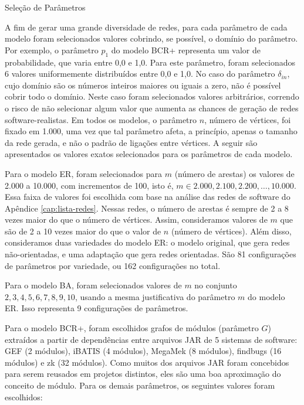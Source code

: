 \begin{section}{Seleção de Parâmetros} \label{sec:parametros}
	
	A fim de gerar uma grande diversidade de redes, para cada parâmetro de cada modelo foram selecionados valores cobrindo, se possível, o domínio do parâmetro. Por exemplo, o parâmetro $p_1$ do modelo BCR+ representa um valor de probabilidade, que varia entre 0,0 e 1,0. Para este parâmetro, foram selecionados 6 valores uniformemente distribuídos entre 0,0 e 1,0. No caso do parâmetro $\delta_{in}$, cujo domínio são os números inteiros maiores ou iguais a zero, não é possível cobrir todo o domínio. Neste caso foram selecionados valores arbitrários, correndo o risco de não selecionar algum valor que aumenta as chances de geração de redes software-realistas. Em todos os modelos, o parâmetro $n$, número de vértices, foi fixado em 1.000, uma vez que tal parâmetro afeta, a princípio, apenas o tamanho da rede gerada, e não o padrão de ligações entre vértices. A seguir são apresentados os valores exatos selecionados para os parâmetros de cada modelo.

Para o modelo ER, foram selecionados para $m$ (número de arestas) os valores de 2.000 a 10.000, com incrementos de 100, isto é, $m \in {2.000, 2.100, 2.200, \ldots, 10.000}$. Essa faixa de valores foi escolhida com base na análise das redes de software do Apêndice \ref{cap:lista-redes}. Nessas redes, o número de arestas é sempre de 2 a 8 vezes maior do que o número de vértices. Assim, consideramos valores de $m$ que são de 2 a 10 vezes maior do que o valor de $n$ (número de vértices). Além disso, consideramos duas variedades do modelo ER: o modelo original, que gera redes não-orientadas, e uma adaptação que gera redes orientadas. São 81 configurações de parâmetros por variedade, ou 162 configurações no total.

Para o modelo BA, foram selecionados valores de $m$ no conjunto ${2, 3, 4, 5, 6, 7, 8, 9, 10}$, usando a mesma justificativa do parâmetro $m$ do modelo ER. Isso representa 9 configurações de parâmetros.

Para o modelo BCR+, foram escolhidos grafos de módulos (parâmetro $G$) extraídos a partir de dependências entre arquivos JAR de 5 sistemas de software: GEF (2 módulos), iBATIS (4 módulos), MegaMek (8 módulos), findbugs (16 módulos) e zk (32 módulos). Como muitos dos arquivos JAR foram concebidos para serem reusados em projetos distintos, eles são uma boa aproximação do conceito de módulo. Para os demais parâmetros, os seguintes valores foram escolhidos:


\end{section}

